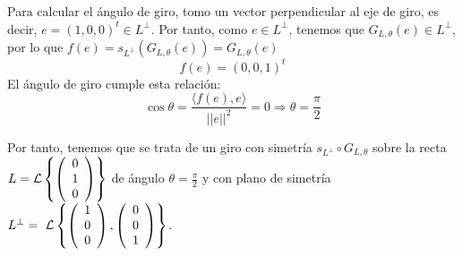 \begin{ejercicio}
\begin{enumerate}
        Para calcular el ángulo de giro, tomo un vector perpendicular al eje de giro, es decir, $e=(1, 0, 0)^t\in L^\perp$. Por tanto, como $e\in L^\perp$, tenemos que $G_{L,\theta}(e)\in L^\perp$, por lo que $f(e)=s_{L^\perp}(G_{L,\theta}(e))=G_{L,\theta}(e)$
        \begin{equation*}
            f(e)=(0, 0, 1)^t
        \end{equation*}
        El ángulo de giro cumple esta relación:
        \begin{equation*}
            \cos \theta = \frac{\langle f(e),e\rangle}{||e||^2} = 0 \Longrightarrow \theta = \frac{\pi}{2}
        \end{equation*}

        Por tanto, tenemos que se trata de un giro con simetría $s_{L^\perp}\circ G_{L,\theta}$ sobre la recta $L=\mathcal{L}\left\{\left(\begin{array}{c}
                     0 \\ 1 \\ 0
                \end{array}\right)\right\}$ de ángulo $\theta=\frac{\pi}{2}$ y con plano de simetría $L^\perp=~\mathcal{L}\left\{\left(\begin{array}{c}
                     1 \\ 0 \\ 0
                \end{array}\right),
                \left(\begin{array}{c}
                     0 \\ 0 \\ 1
                \end{array}\right)\right\}$.

        
    \end{enumerate}
\end{ejercicio}




